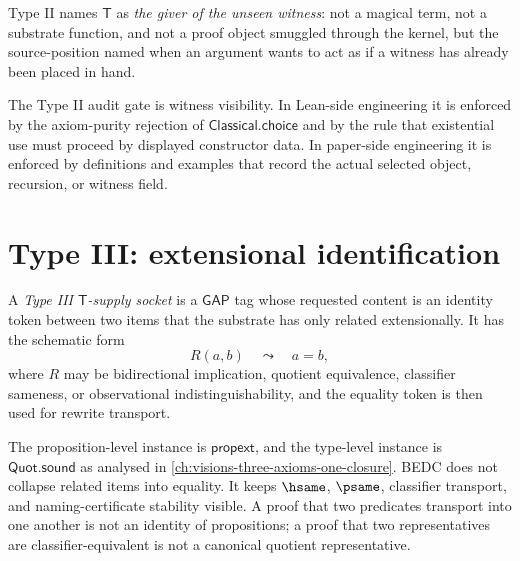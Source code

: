 \begin{definition}
\label{def:transcendental-supply-type-II-reading}
Type II names $\mathsf{T}$ as \emph{the giver of the unseen witness}: not a magical term, not a substrate function, and not a proof object smuggled through the kernel, but the source-position named when an argument wants to act as if a witness has already been placed in hand.
\end{definition}

\begin{remark}
\label{rem:transcendental-supply-type-II-gate}
The Type II audit gate is witness visibility. In Lean-side engineering it is enforced by the axiom-purity rejection of $\mathsf{Classical.choice}$ and by the rule that existential use must proceed by displayed constructor data. In paper-side engineering it is enforced by definitions and examples that record the actual selected object, recursion, or witness field.
\end{remark}

\section{Type III: extensional identification}
\label{sec:transcendental-supply-type-III}

\begin{definition}
\label{def:transcendental-supply-type-III}
A \emph{Type III $\mathsf{T}$-supply socket} is a $\mathsf{GAP}$ tag whose requested content is an identity token between two items that the substrate has only related extensionally. It has the schematic form
$$
R(a,b)
\quad\leadsto\quad
a=b,
$$
where $R$ may be bidirectional implication, quotient equivalence, classifier sameness, or observational indistinguishability, and the equality token is then used for rewrite transport.
\end{definition}

\begin{example}
\label{ex:transcendental-supply-type-III-engineering}
The proposition-level instance is $\mathsf{propext}$, and the type-level instance is $\mathsf{Quot.sound}$ as analysed in \autoref{ch:visions-three-axioms-one-closure}. BEDC does not collapse related items into equality. It keeps $\hsame$, $\psame$, classifier transport, and naming-certificate stability visible. A proof that two predicates transport into one another is not an identity of propositions; a proof that two representatives are classifier-equivalent is not a canonical quotient representative.
\end{example}

